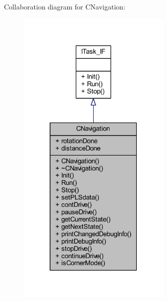 Collaboration diagram for C\+Navigation\+:\nopagebreak
\begin{figure}[H]
\begin{center}
\leavevmode
\includegraphics[width=211pt]{class_c_navigation__coll__graph}
\end{center}
\end{figure}
